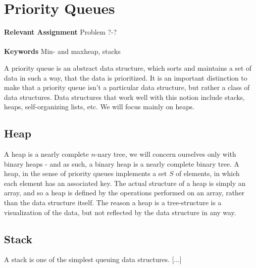 
\chapter{Priority Queues}
\label{ch:priorityqueues}

\textbf{Relevant Assignment} Problem ?-?\\\\
\textbf{Keywords} Min- and maxheap, stacks
\vspace{1in}

\noindent A priority queue is an abstract data structure, which sorts and
maintains a set of data in such a way, that the data is prioritized. It is an
important distinction to make that a priority queue isn't a particular data
structure, but rather a class of data structures. Data structures that work
well with this notion include stacks, heaps, self-organizing lists, etc.
We will focus mainly on heaps.

\section{Heap}
A heap is a nearly complete $n$-nary tree, we will concern ourselves only with
binary heaps - and as such, a binary heap is a nearly complete binary tree. A
heap, in the sense of priority queues implements a set $S$ of elements, in
which each element has an associated key. The actual structure of a heap is
simply an array, and so a heap is defined by the operations performed on an
array, rather than the data structure itself. The reason a heap is a
tree-structure is a visualization of the data, but not reflected by the data
structure in any way.

\section{Stack}
A stack is one of the simplest queuing data structures. [...]

